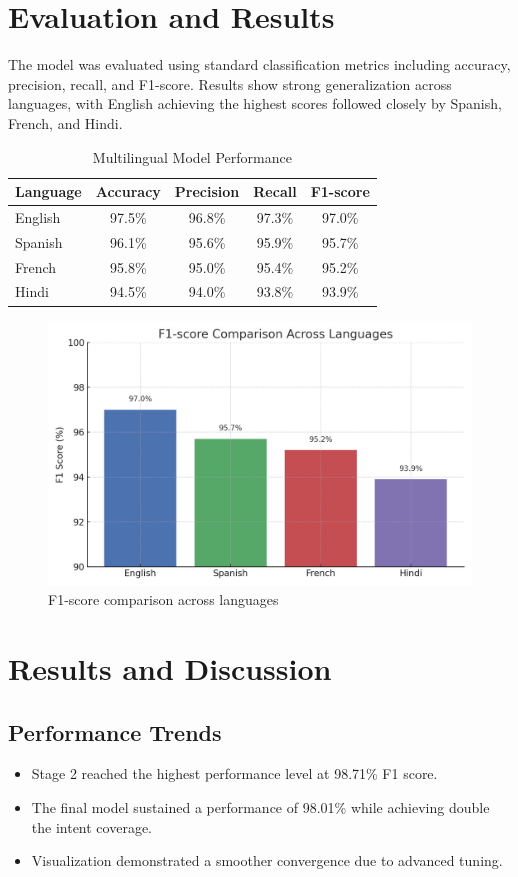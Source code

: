 \documentclass{ecai}
\begin{document}
\section{Evaluation and Results}
The model was evaluated using standard classification metrics including accuracy, precision, recall, and F1-score. Results show strong generalization across languages, with English achieving the highest scores followed closely by Spanish, French, and Hindi.

\begin{table}[H]
\centering
\caption{Multilingual Model Performance}
\begin{tabular}{lcccc}
\toprule
Language & Accuracy & Precision & Recall & F1-score \\
\midrule
English  & 97.5\%   & 96.8\%    & 97.3\% & 97.0\% \\
Spanish  & 96.1\%   & 95.6\%    & 95.9\% & 95.7\% \\
French   & 95.8\%   & 95.0\%    & 95.4\% & 95.2\% \\
Hindi    & 94.5\%   & 94.0\%    & 93.8\% & 93.9\% \\
\bottomrule
\end{tabular}
\end{table}

\begin{figure}[h]
\centering
\includegraphics[width=0.8\linewidth]{f1_chart.png}
\caption{F1-score comparison across languages}
\end{figure}

\section{Results and Discussion}

\subsection{Performance Trends}
\begin{itemize}
    \item Stage 2 reached the highest performance level at 98.71\% F1 score.
    \item The final model sustained a performance of 98.01\% while achieving double the intent coverage.
    \item Visualization demonstrated a smoother convergence due to advanced tuning.
\end{itemize}
\end{document}
